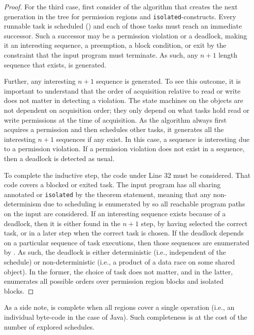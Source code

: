 \begin{proof}
For the third case, first consider  of the algorithm that creates
the next generation in the tree for permission regions and {\tt isolated}-constructs. Every runnable task is scheduled () and each of those tasks
must reach an immediate successor. Such a successor may be a permission violation or a deadlock, making it an interesting sequence, a preemption, a
block condition, or exit by the constraint that the input program must
terminate. As such, any $n+1$ length sequence that exists, is
generated.

Further, any interesting $n+1$ sequence is generated. To see
this outcome, it is important to understand that the order of
acquisition relative to read or write does not matter in detecting a
violation. The state machines on the objects are not dependent on
acquisition order; they only depend on what tasks hold read or write permissions
at the time of acquisition. As the algorithm always first
acquires a permission and then schedules other tasks, it generates all
the interesting $n+1$ sequences if any exist. In this case, a sequence is interesting due to a permission violation. If a permission violation does not exist in a sequence, then a deadlock is
detected as usual.

To complete the inductive step, the code under Line 32 must be considered. That code covers
a blocked or exited task. The input program has all sharing
annotated or {\tt isolated} by the theorem statement, meaning that any non-determinism
due to scheduling is enumerated by  so all reachable
program paths on the input are considered. If an interesting sequence exists
because of a deadlock, then it is either found in the $n+1$ step, by
having selected the correct task, or in a later step when the
correct task is chosen. If the deadlock depends on a particular sequence of
task executions, then those sequences are enumerated by . As
such, the deadlock is either deterministic (i.e., independent of the
schedule) or non-deterministic (i.e., a product of a data race on some
shared object). In the former, the choice of task does not matter,
and in the latter,  enumerates all possible orders over permission region blocks and 
isolated blocks.
\end{proof}
As a side note,  is complete when all regions
cover a single operation (i.e., an individual byte-code in the case of Java). Such completeness is at the cost of the number of explored schedules.
